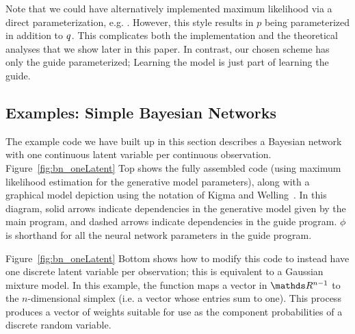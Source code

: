 Note that we could have alternatively implemented maximum likelihood via a direct parameterization, e.g. . However, this style results in $p$ being parameterized in addition to $q$. This complicates both the implementation and the theoretical analyses that we show later in this paper.
In contrast, our chosen scheme has only the guide parameterized; Learning the model is just part of learning the guide.


\subsection{Examples: Simple Bayesian Networks}

The example code we have built up in this section describes a Bayesian network with one continuous latent variable per continuous observation. Figure~\ref{fig:bn_oneLatent} Top shows the fully assembled code (using maximum likelihood estimation for the generative model parameters), along with a graphical model depiction using the notation of Kigma and Welling~\cite{AEVB}. In this diagram, solid arrows indicate dependencies in the generative model given by the main program, and dashed arrows indicate dependencies in the guide program. $\phi$ is shorthand for all the neural network parameters in the guide program.

Figure~\ref{fig:bn_oneLatent} Bottom shows how to modify this code to instead have one discrete latent variable per observation; this is equivalent to a Gaussian mixture model. In this example, the  function maps a vector in $\Reals^{n-1}$ to the $n$-dimensional simplex (i.e. a vector whose entries sum to one). This process produces a vector of weights suitable for use as the component probabilities of a discrete random variable.


